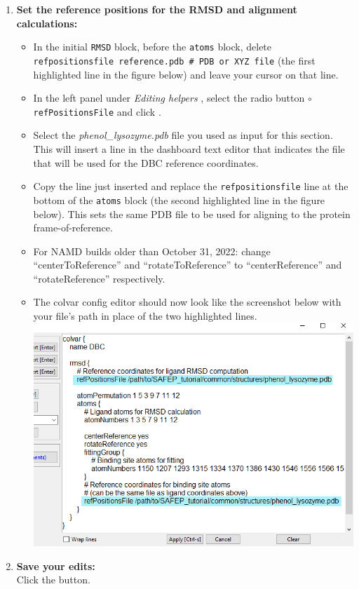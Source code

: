 \documentclass[9pt,tutorial]{Styling/livecoms}
\newcommand{\filepath}[1]{\textit{#1}}
\newcommand{\button}[1]{
  \inlineBox[gray]{\texttt{#1}}
}
\newcommand{\menu}[1]{
  \textit{#1}
}
\newcommand{\option}[1]{
  \texttt{#1}
}
\newcommand{\textInput}[1]{
  \texttt{#1}
}
\begin{document}
\begin{enumerate}
\begin{enumerate}[label=\alph*., ref=\theenumi.\alph*]
             \item \textbf{Set the reference positions for the RMSD and alignment calculations:} 
             \begin{itemize}
                 \item In the initial \textInput{RMSD} block, before the \textInput{atoms} block, delete \textInput{refpositionsfile reference.pdb \# PDB or XYZ file} (the first highlighted line in the figure below) and leave your cursor on that line.
                \item In the left panel under \menu{Editing helpers}, select the radio button \option{$\circ$  refPositionsFile} and click \button{Pick File}. 
                \item Select the \filepath{phenol\_lysozyme.pdb} file you used as input for this section. This will insert a line in the dashboard text editor that indicates the file that will be used for the DBC reference coordinates.
                \item Copy the line just inserted and replace the \textInput{refpositionsfile} line at the bottom of the \textInput{atoms} block (the second highlighted line in the figure below). This sets the same PDB file to be used for aligning to the protein frame-of-reference.
                \item For NAMD builds older than October 31, 2022: change ``centerToReference'' and ``rotateToReference'' to ``centerReference'' and ``rotateReference'' respectively.
                \item The colvar config editor should now look like the screenshot below with your file's path in place of the two highlighted lines.\\
                \includegraphics[width=0.75\linewidth ]{CV_dashboard_StepA.png} \label{fig:refposfiles}
            \end{itemize}
            \item \textbf{Save your edits:}\\
            Click the \button{Apply [Ctrl-s]} button.
        \end{enumerate}
        

\end{enumerate}
\end{document}
